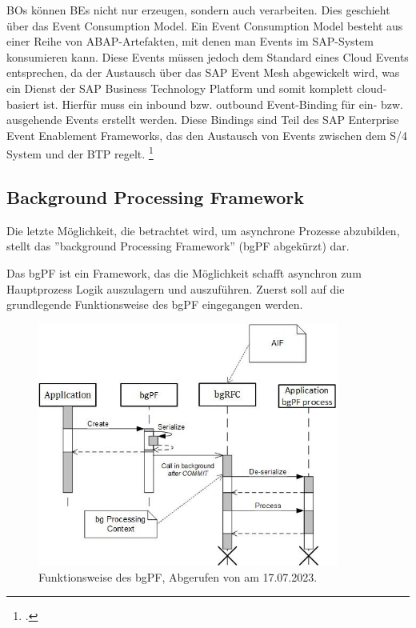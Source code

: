 BOs können BEs nicht nur erzeugen, sondern auch verarbeiten. Dies geschieht über das Event Consumption Model. Ein Event Consumption Model besteht aus einer Reihe von ABAP-Artefakten, mit denen man Events im SAP-System konsumieren kann. Diese Events müssen jedoch dem Standard eines Cloud Events entsprechen, da der Austausch über das SAP Event Mesh abgewickelt wird, was ein Dienst der SAP Business Technology Platform und somit komplett cloud-basiert ist. Hierfür muss ein inbound bzw. outbound Event-Binding für ein- bzw. ausgehende Events erstellt werden. Diese Bindings sind Teil des SAP Enterprise Event Enablement Frameworks, das den Austausch von Events zwischen dem S/4 System und der BTP regelt. \footcite[Vgl.][]{sap_creating_2022}

\subsection{Background Processing Framework}

Die letzte Möglichkeit, die betrachtet wird, um asynchrone Prozesse abzubilden, stellt das ''background Processing Framework'' (bgPF abgekürzt) dar.

Das bgPF ist ein Framework, das die Möglichkeit schafft asynchron zum Hauptprozess Logik auszulagern und auszuführen. Zuerst soll auf die grundlegende Funktionsweise des bgPF eingegangen werden.

\begin{figure}[H]
 \centering
 \includegraphics[height=8cm]{Bilder/bgPF_Schema.png}
 \caption[Funktionsweise des bgPF]{Funktionsweise des bgPF, Abgerufen von \cite{sap_bgpf_2023} am 17.07.2023.}
 \label{fig:iso_norm}
\end{figure}

